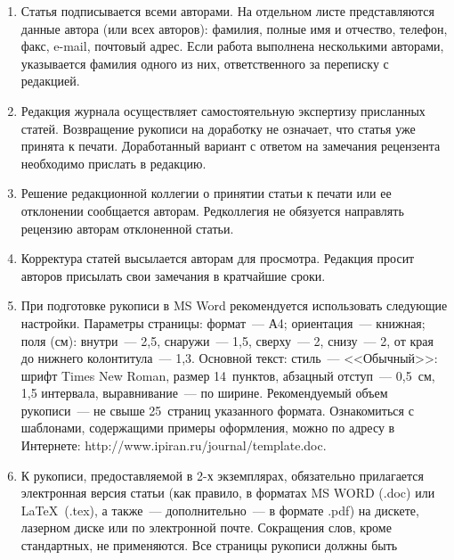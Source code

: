 {{\begin{enumerate}
Указанное соглашение может быть представлено 
как в бумажном виде, так и в виде отсканированной копии (с подписями авторов).


Редколлегия вправе запросить у авторов экспертное заключение о возможности
опубликования представленной статьи в открытой печати. %
\item Статья
подписывается всеми авторами. На отдельном листе представляются данные автора
(или всех авторов): фамилия, полные имя и отчество, телефон, факс, e-mail,
почтовый адрес. Если работа выполнена несколькими авторами, указывается фамилия
одного из них, ответственного за переписку с редакцией. %
\item Редакция журнала
осуществляет самостоятельную экспертизу присланных статей. Возвращение рукописи
на доработку не означает, что статья уже принята к печати. Доработанный вариант
с ответом на замечания рецензента необходимо прислать в редакцию. %
\item Решение
редакционной коллегии о принятии статьи к печати или ее отклонении сообщается
авторам. Редколлегия не обязуется направлять рецензию авторам отклоненной
статьи. %
\item Корректура статей высылается авторам для просмотра. Редакция
просит авторов присылать свои замечания в кратчайшие сроки. %
\item При
подготовке рукописи в MS Word рекомендуется использовать следующие настройки.
Параметры страницы: формат~--- А4; ориентация~--- книжная; поля (см): внутри~---
2,5, снаружи~--- 1,5, сверху~--- 2, снизу~--- 2, от края до нижнего
колонтитула~--- 1,3. Основной текст: стиль~--- <<Обычный>>: шрифт Times New
Roman, размер 14~пунктов, абзацный отступ~--- 0,5~см, 1,5 интервала,
выравнивание~--- по ширине. Рекомендуемый объем рукописи~--- не свыше
25~страниц указанного формата. Ознакомиться с шаблонами, содержащими примеры
оформления, можно по адресу в Интернете:
\textsf{http://www.ipiran.ru/journal/template.doc}.
\item К рукописи, предоставляемой в 2-х
экземплярах, обязательно прилагается электронная версия статьи (как правило, в
форматах MS WORD (.doc) или \LaTeX\ (.tex), а также~--- дополнительно~--- в
формате .pdf) на дискете, лазерном диске или по электронной почте. Сокращения
слов, кроме стандартных, не применяются. Все страницы рукописи должны быть

\end{enumerate}}}
